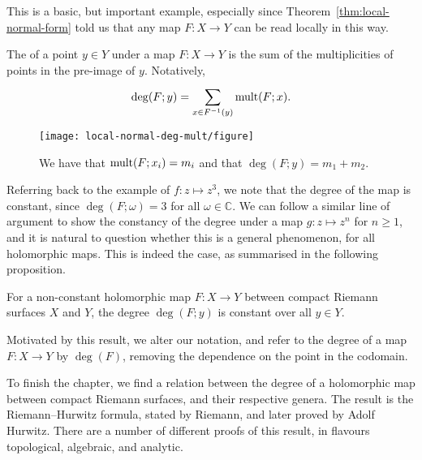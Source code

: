 \begin{remark}
	This is a basic, but important example, especially since
	Theorem~\ref{thm:local-normal-form} told us that any map $ F:X \to Y $ can be
	read locally in this way.
\end{remark}

\begin{definition}[Degree]
	The  of a point $ y \in Y $ under a map $ F:X \to Y $ is the
	sum of the multiplicities of points in the pre-image of $ y $. Notatively,
	\begin{align*}
		\deg(F;y) = \sum_{x \in F ^{-1}(y)}^{}{\operatorname{mult}(F;x)}.
	\end{align*}
\end{definition}

\begin{figure*}
	\centering
	\texttt{[image: local-normal-deg-mult/figure]}
	\caption{We have that $ \operatorname{mult}(F;x_i)=m_i $ and that $ \deg(F;y)=m_1+m_2 $.}
\end{figure*}

Referring back to the example of $ f:z \mapsto z^3 $, we note that the degree of
the map is constant, since $ \deg(F;\omega)=3 $ for all $ \omega \in \mathbb{C}
$. We can follow a similar line of argument to show the constancy of the degree
under a map $ g:z \mapsto z^n $ for $ n \geq 1 $, and it is natural to question
whether this is a general phenomenon, for all holomorphic maps. This is indeed
the case, as summarised in the following proposition.

\begin{proposition}\label{prop:constant-degree}
	For a non-constant holomorphic map $ F:X \to Y $ between compact Riemann
	surfaces $ X $ and $ Y $, the degree $ \deg(F;y) $ is constant over all $ y \in
		Y$.
\end{proposition}

\begin{notation}
	Motivated by this result, we alter our notation, and refer to the degree of a
	map $ F:X \to Y $ by $ \deg(F) $, removing the dependence on the point in the
	codomain.
\end{notation}

To finish the chapter, we find a relation between the degree of a holomorphic
map between compact Riemann surfaces, and their respective genera. The result is
the Riemann--Hurwitz formula, stated by Riemann, and later proved by Adolf
Hurwitz. There are a number of different
proofs of this result, in flavours topological, algebraic, and
analytic.

